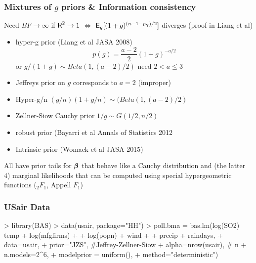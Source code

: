 \documentclass[]{beamer}
\begin{document}
\begin{frame}
  \frametitle{Mixtures of $g$ priors \& Information consistency}

Need $BF \to \infty$ if $\textsf{R}^2 \to 1$  $\Leftrightarrow$ $\textsf{E}_g[(1 +
g)^{(n-1-p_{\boldsymbol{\gamma}})/2}]$ diverges  (proof in Liang et al)
\pause
\begin{itemize}

\item hyper-g prior (Liang et al JASA 2008)
$$p(g) = \frac{a-2}{2}(1 + g)^{-a/2}$$ or $g/(1+g) \sim Beta(1, (a-2)/2)$
need $2 < a \le 3$
\pause
\item Jeffreys prior on $g$ corresponds to $a = 2$ (improper) \pause
\item Hyper-g/n  $(g/n)(1 + g/n) \sim (Beta(1, (a-2)/2)$ \pause
\item Zellner-Siow Cauchy prior $1/g \sim G(1/2, n/2)$ \pause
\item robust prior (Bayarri et al Annals of Statistics 2012 \pause
\item Intrinsic prior (Womack et al  JASA 2015)
\end{itemize}

 All have prior tails for $\boldsymbol{\beta}$  that behave like a Cauchy distribution
 and (the latter 4) marginal  likelihoods that can be computed using special hypergeometric
 functions   ($_2F_1$, Appell $F_1$)
\end{frame}


\begin{frame}[fragile]
\frametitle{USair Data}
\begin{Schunk}
\begin{Sinput}
> library(BAS)
> data(usair, package="HH")
> poll.bma = bas.lm(log(SO2) ~ temp + log(mfgfirms) +
+                              log(popn) + wind +
+                              precip + raindays,
+                   data=usair,
+                   prior="JZS",  #Jeffrey-Zellner-Siow
+                   alpha=nrow(usair), # n
+                   n.models=2^6,
+                   modelprior = uniform(),
+                   method="deterministic")
\end{Sinput}
\end{Schunk}


\end{frame}
\end{document}
